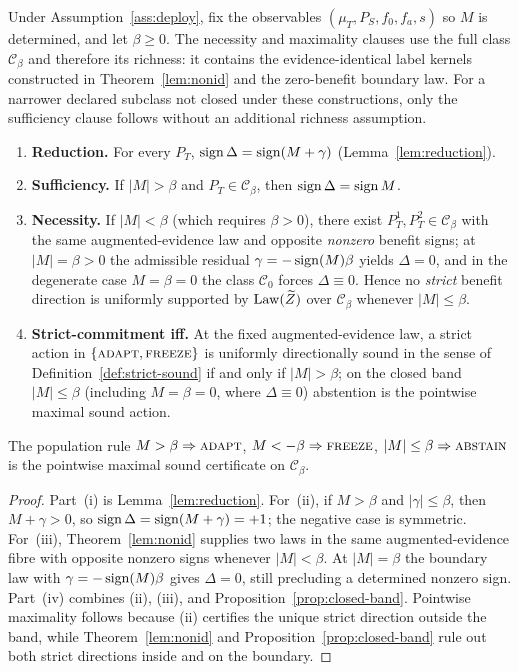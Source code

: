 \begin{theorem}\label{thm:headline}\label{thm:frontier}
Under Assumption~\ref{ass:deploy}, fix the observables $(\mu_T,P_S,f_0,f_a,s)$ so $M$ is
determined, and let $\beta\ge0$. The necessity and maximality clauses use the full class
$\mathcal C_\beta$ and therefore its richness: it contains the evidence-identical label kernels
constructed in Theorem~\ref{lem:nonid} and the zero-benefit boundary law. For a narrower declared
subclass not closed under these constructions, only the sufficiency clause follows without an
additional richness assumption.
\begin{enumerate}
\item[\textnormal{(i)}] \textbf{Reduction.} For every $P_T$, $\operatorname{sign}\Delta=\operatorname{sign}(M+\gamma)$
(Lemma~\ref{lem:reduction}).
\item[\textnormal{(ii)}] \textbf{Sufficiency.} If $|M|>\beta$ and $P_T\in\mathcal{C}_\beta$, then
$\operatorname{sign}\Delta=\operatorname{sign} M$.
\item[\textnormal{(iii)}] \textbf{Necessity.} If $|M|<\beta$ (which requires $\beta>0$), there exist
$P_T^1,P_T^2\in\mathcal{C}_\beta$ with the same augmented-evidence law and opposite \emph{nonzero} benefit
signs; at $|M|=\beta>0$ the admissible residual $\gamma=-\operatorname{sign}(M)\beta$ yields $\Delta=0$, and in the
degenerate case $M=\beta=0$ the class $\mathcal{C}_0$ forces $\Delta\equiv0$. Hence no \emph{strict}
benefit direction is uniformly supported by $\mathrm{Law}(\widetilde Z)$ over $\mathcal{C}_\beta$
whenever $|M|\le\beta$.
\item[\textnormal{(iv)}] \textbf{Strict-commitment iff.} At the fixed augmented-evidence law, a
strict action in $\{\textnormal{\textsc{adapt}},\textnormal{\textsc{freeze}}\}$ is uniformly directionally sound in the
sense of Definition~\ref{def:strict-sound} if and only if
$|M|>\beta$; on the closed band $|M|\le\beta$ (including $M=\beta=0$, where $\Delta\equiv0$) abstention
is the pointwise maximal sound action.
\end{enumerate}
The population rule $M>\beta\Rightarrow\textnormal{\textsc{adapt}}$, $M<-\beta\Rightarrow\textnormal{\textsc{freeze}}$,
$|M|\le\beta\Rightarrow\textnormal{\textsc{abstain}}$ is the pointwise maximal sound certificate on
$\mathcal{C}_\beta$.
\end{theorem}
\begin{proof}
Part~(i) is Lemma~\ref{lem:reduction}. For~(ii), if $M>\beta$ and $|\gamma|\le\beta$, then
$M+\gamma>0$, so $\operatorname{sign}\Delta=\operatorname{sign}(M+\gamma)=+1$; the negative case is symmetric. For~(iii),
Theorem~\ref{lem:nonid} supplies two laws in the same augmented-evidence fibre with opposite
nonzero signs whenever $|M|<\beta$. At $|M|=\beta$ the boundary law with
$\gamma=-\operatorname{sign}(M)\beta$ gives $\Delta=0$, still precluding a determined nonzero sign. Part~(iv)
combines (ii), (iii), and Proposition~\ref{prop:closed-band}. Pointwise maximality follows because
(ii) certifies the unique strict direction outside the band, while Theorem~\ref{lem:nonid} and
Proposition~\ref{prop:closed-band} rule out both strict directions inside and on the boundary.
\end{proof}

